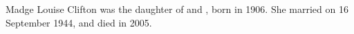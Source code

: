 
Madge Louise Clifton was the daughter of  and , born in 1906.
She married  on 16 September 1944,\cite{GilmoreEngagement1944} and died in 2005.
